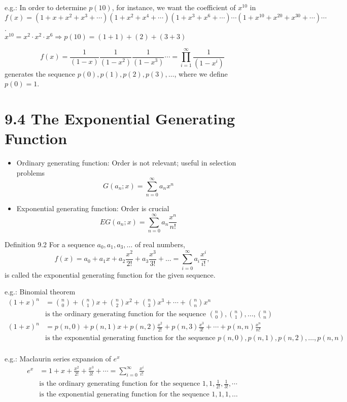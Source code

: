 \documentclass[a4paper]{article}
\begin{document}
\color{red}e.g.: \color{black} In order to determine $p(10)$, for instance, we want the coefficient of $x^{10}$ in $f(x)=(1+x+x^2+x^3+\cdots)(1+x^2+x^4+\cdots)(1+x^3+x^6+\cdots)\cdots(1+x^{10}+x^{20}+x^{30}+\cdots)\cdots$.\\
$x^{10}=x^2\cdot x^2\cdot x^6\Rightarrow p(10)=(1+1)+(2)+(3+3)$

$$f(x)=\frac{1}{(1-x)}\frac{1}{(1-x^2)}\frac{1}{(1-x^3)}\cdots=\prod_{i=1}^{\infty}{\frac{1}{(1-x^i)}}$$ generates the sequence $p(0),p(1),p(2),p(3),\ldots$, where we define $p(0)=1$.

\section*{9.4 The Exponential Generating Function}
\begin{itemize}
    \item Ordinary generating function: Order is not relevant; useful in selection problems
    $$G(a_n;x)=\sum_{n=0}^{\infty}{a_nx^n}$$
    \item Exponential generating function: Order is crucial
    $$EG(a_n;x)=\sum_{n=0}^{\infty}{a_n\frac{x^n}{n!}}$$
\end{itemize}
\color{green}Definition 9.2 \color{black} For a sequence $a_0, a_1, a_3, \dots$ of real numbers, $$f(x)=a_0+a_1x+a_2\frac{x^2}{2!}+a_3\frac{x^3}{3!}+\dots=\sum_{i=0}^{\infty}{a_i\frac{x^i}{i!}},$$ is called the exponential generating function for the given sequence.

\color{red}e.g.: \color{black} Binomial theorem
\begin{align*}
(1+x)^n&=\binom{n}{0}+\binom{n}{1}x+\binom{n}{2}x^2+\binom{n}{3}x^3+\cdots+\binom{n}{n}x^n\\
&\text{is the ordinary generating function for the sequence }\binom{n}{0},\binom{n}{1},\dots,\binom{n}{n}\\
(1+x)^n&=p(n,0)+p(n,1)x+p(n,2)\frac{x^2}{2!}+p(n,3)\frac{x^3}{3!}+\cdots+p(n,n)\frac{x^n}{n!}\\
&\text{is the exponential generating function for the sequence }p(n,0),p(n,1),p(n,2),\dots, p(n,n)\\
\end{align*}

\color{red}e.g.: \color{black} Maclaurin series expansion of $e^x$
\begin{align*}
e^x&=1+x+\frac{x^2}{2!}+\frac{x^3}{3!}+\cdots=\sum_{i=0}^{\infty}{\frac{x^i}{i!}}\\
&\text{is the ordinary generating function for the sequence }1,1,\frac{1}{2!},\frac{1}{3!},\cdots\\
&\text{is the exponential generating function for the sequence }1,1,1,\dots\\
\end{align*}
\end{document}
